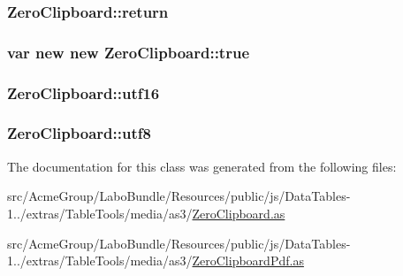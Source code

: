 \hypertarget{class_zero_clipboard_a35a5b97b41eebd1117dbdcefc04a990d}{
\subsubsection[{return}]{\setlength{\rightskip}{0pt plus 5cm}Zero\+Clipboard\+::return}}\label{class_zero_clipboard_a35a5b97b41eebd1117dbdcefc04a990d}
\hypertarget{class_zero_clipboard_ab4147b8aacc838ecabcc37b0afa8a676}{
\subsubsection[{true}]{\setlength{\rightskip}{0pt plus 5cm}var new new Zero\+Clipboard\+::true}}\label{class_zero_clipboard_ab4147b8aacc838ecabcc37b0afa8a676}
\hypertarget{class_zero_clipboard_adea87e5ad97728dbe4c6e07d72bca56b}{
\subsubsection[{utf16}]{ Zero\+Clipboard\+::utf16}}\label{class_zero_clipboard_adea87e5ad97728dbe4c6e07d72bca56b}
\hypertarget{class_zero_clipboard_aac6800a9ea2987f07e6cd7d3fb33dcc4}{
\subsubsection[{utf8}]{ Zero\+Clipboard\+::utf8}}\label{class_zero_clipboard_aac6800a9ea2987f07e6cd7d3fb33dcc4}


The documentation for this class was generated from the following files\+:\begin{DoxyCompactItemize}
\item 
src/\+Acme\+Group/\+Labo\+Bundle/\+Resources/public/js/\+Data\+Tables-\/1../extras/\+Table\+Tools/media/as3/\hyperlink{_zero_clipboard_8as}{Zero\+Clipboard.\+as}\item 
src/\+Acme\+Group/\+Labo\+Bundle/\+Resources/public/js/\+Data\+Tables-\/1../extras/\+Table\+Tools/media/as3/\hyperlink{_zero_clipboard_pdf_8as}{Zero\+Clipboard\+Pdf.\+as}\end{DoxyCompactItemize}
